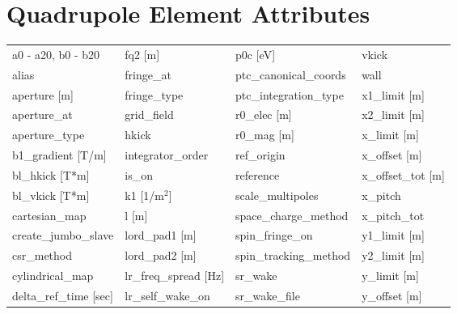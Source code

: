  \section{Quadrupole Element Attributes}
 \label{s:list.quadrupole}
 
 \begin{tabular}{llll} \toprule
a0 - a20, b0 - b20             & fq2 [m]                        & p0c [eV]                       & vkick                          \\
alias                          & fringe_at                      & ptc_canonical_coords           & wall                           \\
aperture [m]                   & fringe_type                    & ptc_integration_type           & x1_limit [m]                   \\
aperture_at                    & grid_field                     & r0_elec [m]                    & x2_limit [m]                   \\
aperture_type                  & hkick                          & r0_mag [m]                     & x_limit [m]                    \\
b1_gradient [T/m]              & integrator_order               & ref_origin                     & x_offset [m]                   \\
bl_hkick [T*m]                 & is_on                          & reference                      & x_offset_tot [m]               \\
bl_vkick [T*m]                 & k1 [1/m$^2$]                   & scale_multipoles               & x_pitch                        \\
cartesian_map                  & l [m]                          & space_charge_method            & x_pitch_tot                    \\
create_jumbo_slave             & lord_pad1 [m]                  & spin_fringe_on                 & y1_limit [m]                   \\
csr_method                     & lord_pad2 [m]                  & spin_tracking_method           & y2_limit [m]                   \\
cylindrical_map                & lr_freq_spread [Hz]            & sr_wake                        & y_limit [m]                    \\
delta_ref_time [sec]           & lr_self_wake_on                & sr_wake_file                   & y_offset [m]                   \\

\end{tabular}
